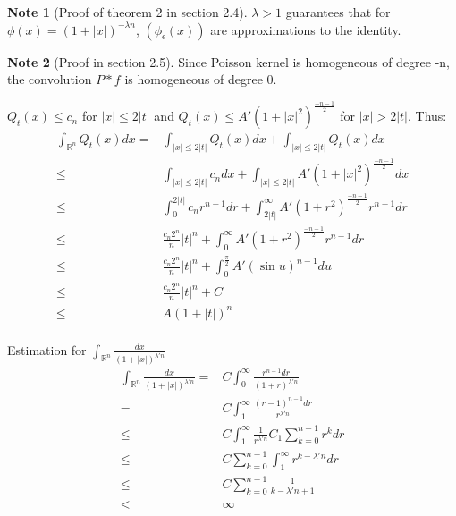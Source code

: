 \documentclass{report}
\theoremstyle{definition}
\newtheorem{note}{Note}
\theoremstyle{definition}
\theoremstyle{plain}
\numberwithin{theorem}{section}
\numberwithin{remark}{section}
\numberwithin{equation}{section}
\newcommand{\abs}[1]{\left\lvert#1\right\rvert}
\begin{document}
\begin{note}[Proof of theorem 2 in section 2.4]
    $\lambda>1$ guarantees that for $\phi(x)=(1+\abs{x})^{-\lambda n}$, $(\phi_\epsilon(x))$ are approximations to the identity. \par
\end{note}
\begin{note}[Proof in section 2.5]
    Since Poisson kernel is homogeneous of degree -n, the convolution $P*f$ is homogeneous of degree 0.\par
    $Q_t(x)\leq c_n$ for $\abs{x}\leq 2\abs{t}$ and $Q_t(x)\leq A'(1+\abs{x}^2)^{\frac{-n-1}{2}}$ for $\abs{x}> 2\abs{t}$. Thus:
    \begin{align*}
        \int_{\mathbb{R}^n}Q_t(x)dx=&\int_{\abs{x}\leq 2\abs{t}}Q_t(x)dx+\int_{\abs{x}\leq 2\abs{t}}Q_t(x)dx\\
        \leq&\int_{\abs{x}\leq 2\abs{t}}c_n dx+\int_{\abs{x}\leq 2\abs{t}}A'(1+\abs{x}^2)^{\frac{-n-1}{2}}dx\\
        \leq&\int_{0}^{2\abs{t}}c_n r^{n-1} dr+\int_{2\abs{t}}^{\infty} A'(1+r^2)^{\frac{-n-1}{2}}r^{n-1}dr\\
        \leq&\frac{c_n2^n}{n}\abs{t}^{n} +\int_{0}^{\infty} A'(1+r^2)^{\frac{-n-1}{2}}r^{n-1}dr\\
        \leq&\frac{c_n2^n}{n}\abs{t}^{n} +\int_{0}^{\frac{\pi}{2}} A'(\sin{u})^{n-1}du\\
        \leq&\frac{c_n2^n}{n}\abs{t}^{n} +C\\
        \leq&A(1+\abs{t})^n\\
    \end{align*}\par
    Estimation for $\int_{\mathbb{R}^n}{\frac{dx}{(1+\abs{x})^{\lambda'n}}}$
    \begin{align*}
        \int_{\mathbb{R}^n}{\frac{dx}{(1+\abs{x})^{\lambda'n}}}=&C\int_{0}^{\infty}\frac{r^{n-1}dr}{(1+r)^{\lambda'n}}\\
        =&C\int_{1}^{\infty}\frac{(r-1)^{n-1}dr}{r^{\lambda'n}}\\
        \leq&C\int_{1}^{\infty}\frac{1}{r^{\lambda'n}}C_1\sum_{k=0}^{n-1}r^k dr\\
        \leq&C\sum_{k=0}^{n-1}\int_{1}^{\infty}r^{k-\lambda'n} dr\\
        \leq&C\sum_{k=0}^{n-1}\frac{1}{k-\lambda'n+1}\\
        <&\infty
    \end{align*}
\end{note}
\end{document}
